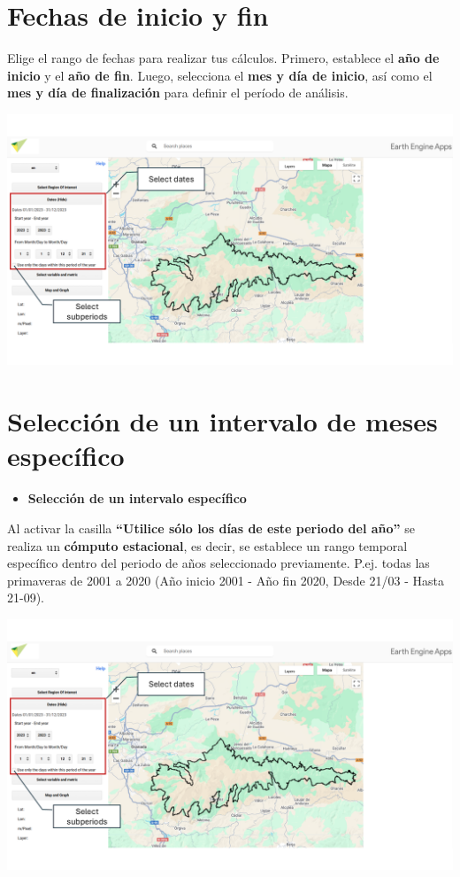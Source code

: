 \documentclass[
]{book}
\providecommand{\tightlist}{%
  \setlength{\itemsep}{0pt}\setlength{\parskip}{0pt}}
\begin{document}
\chapter{Fechas de inicio y fin}\label{fechas}

Elige el rango de fechas para realizar tus cálculos. Primero, establece el \textbf{año de inicio} y el \textbf{año de fin}. Luego, selecciona el \textbf{mes y día de inicio}, así como el \textbf{mes y día de finalización} para definir el período de análisis.

\includegraphics{assets/dates.png}

\chapter{Selección de un intervalo de meses específico}\label{periodo}

\begin{itemize}
\tightlist
\item
  \textbf{Selección de un intervalo específico}
\end{itemize}

Al activar la casilla \textbf{``Utilice sólo los días de este periodo del año''} se realiza un \textbf{cómputo estacional}, es decir, se establece un rango temporal específico dentro del periodo de años seleccionado previamente. P.ej. todas las primaveras de 2001 a 2020 (Año inicio 2001 - Año fin 2020, Desde 21/03 - Hasta 21-09).

\includegraphics{assets/dates.png}
\end{document}
